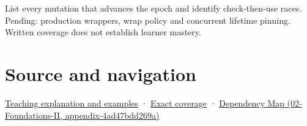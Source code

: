 List every mutation that advances the epoch and identify check-then-use races. Pending: production wrappers, wrap policy and concurrent lifetime pinning. Written coverage does not establish learner mastery.

\section{Source and navigation}\label{appendix-aa405b7c3903-source-and-navigation}

\href{Continuous\%20Notes/Computing\%20Foundations\%20-\%20From\%20Bits\%20to\%20C++\%20and\%20Systems\%20APIs\#When\%20a\%20valid\%20borrow\%20stops\%20naming\%20the\%20intended\%20thing}{Teaching explanation and examples} · \hyperref[appendix-fd090d982a15-m008---parts-113-126]{Exact coverage} · \href{../02-Foundations-II/main.pdf\#nameddest=appendix-4ad47bdd269a}{Dependency Map (02-Foundations-II, appendix-4ad47bdd269a)}
